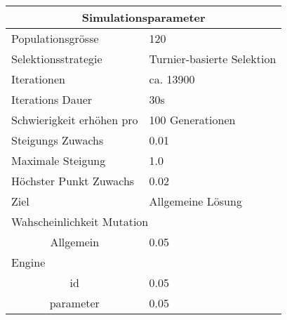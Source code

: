 
    \begin{tabular}{ | l | l | }
      \hline
      \multicolumn{2}{|c|}{Simulationsparameter} \\
      \hline
      Populationsgrösse & 120 \\ \hline
      Selektionsstrategie & Turnier-basierte Selektion \\ \hline
      Iterationen & ca. 13900 \\ \hline
      Iterations Dauer & 30s \\ \hline
      Schwierigkeit erhöhen pro & 100 Generationen \\ \hline
      Steigungs Zuwachs & 0.01 \\ \hline
      Maximale Steigung & 1.0 \\ \hline
      Höchster Punkt Zuwachs & 0.02 \\ \hline
      Ziel & Allgemeine Lösung \\ \hline
      \multicolumn{2}{|l|}{Wahscheinlichkeit Mutation}\\ \hline
      \multicolumn{1}{|c|}{Allgemein} & 0.05 \\ \hline
      Engine &  \\ \hline
      \multicolumn{1}{|c|}{id} & 0.05 \\ \hline
      \multicolumn{1}{|c|}{parameter} & 0.05 \\ \hline
    \end{tabular}

